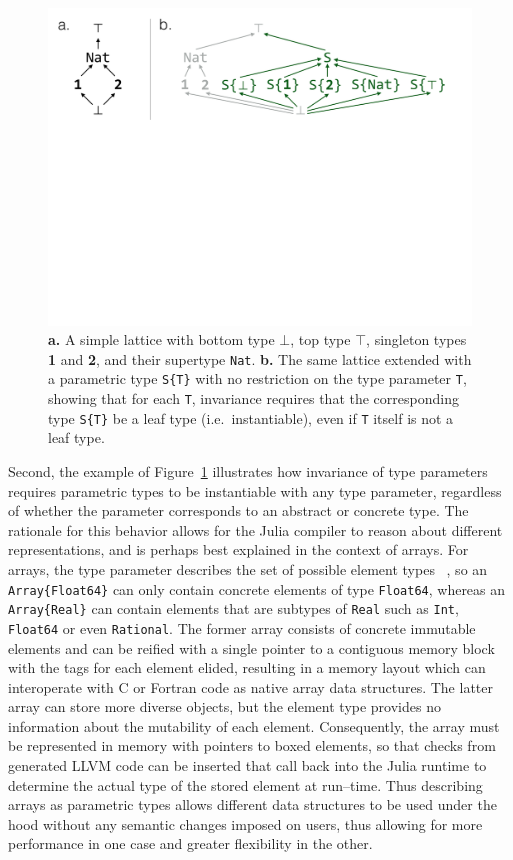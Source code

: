 \documentclass[pldi]{sigplanconf-pldi15}
\begin{document}
\begin{figure}
	\centering
	\includegraphics[width=\columnwidth]{fig-lattice}
	\caption{
		\textbf{a.} A simple lattice with bottom type $\bot$, top type
		$\top$, singleton types \textbf{1} and \textbf{2}, and their
		supertype \texttt{Nat}.
		\textbf{b.} The same lattice extended with a parametric type
		\texttt{S\{T\}} with no restriction on the type parameter
		\texttt{T}, showing that for each \texttt{T}, invariance
		requires that the corresponding type \texttt{S\{T\}} be a leaf
		type (i.e.\ instantiable), even if \texttt{T} itself is not a
		leaf type.}
	\label{fig:lattice}
\end{figure}

Second, the example of Figure~\ref{fig:lattice} illustrates how invariance of
type parameters requires parametric types to be instantiable with any type
parameter, regardless of whether the parameter corresponds to an abstract or
concrete type. The rationale for this behavior allows for the Julia compiler to
reason about different representations, and is perhaps best explained in the
context of arrays. For arrays, the type parameter describes the set of possible
element types ~\cite{Bezanson2014}, so an \verb|Array{Float64}|
can only contain concrete elements of type \verb|Float64|, whereas an
\verb|Array{Real}| can contain elements that are subtypes of \verb|Real| such
as \verb|Int|, \verb|Float64| or even \verb|Rational|. The former array
consists of concrete immutable elements and can be reified with a single
pointer to a contiguous memory block with the tags for each element elided,
resulting in a memory layout which can interoperate with C or Fortran code as
native array data structures. The latter array can store more diverse objects,
but the element type provides no information about the mutability of each
element. Consequently, the array must be represented in memory with pointers to
boxed elements, so that checks from generated LLVM code can be inserted that
call back into the Julia runtime to determine the actual type of the stored
element at run--time. Thus describing arrays as parametric types allows
different data structures to be used under the hood without any semantic
changes imposed on users, thus allowing for more performance in one case and
greater flexibility in the other.
\end{document}
